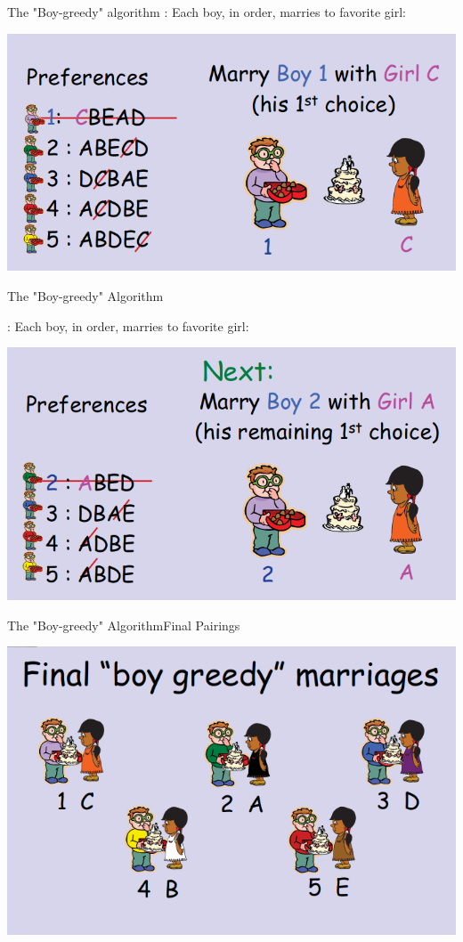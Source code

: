 \begin{frame}{The "Boy-greedy" algorithm}
  : Each boy, in order, marries to favorite girl:
  \begin{center}
    \includegraphics[width=.7\textwidth]{../img/marriage3}
  \end{center}
\end{frame}

\begin{frame}{The "Boy-greedy" Algorithm}

  : Each boy, in order, marries to favorite girl:
  \begin{center}
    \includegraphics[width=.7\textwidth]{../img/marriage4}
  \end{center}
\end{frame}

\begin{frame}{The "Boy-greedy" Algorithm}{Final Pairings}

  \begin{center}
    \includegraphics[width=.7\textwidth]{../img/marriage5}
  \end{center}
\end{frame}

